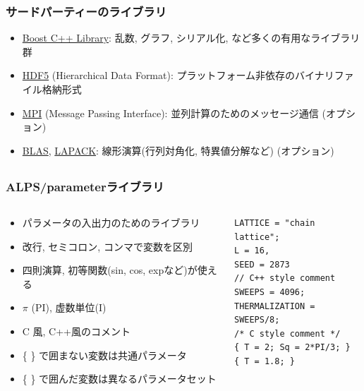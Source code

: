 \begin{frame}[t,fragile]
  \frametitle{サードパーティーのライブラリ}
  \begin{itemize}
    \setlength{\itemsep}{1em}
  \item \href{http://www.boost.org/}{Boost C++ Library}: 乱数, グラフ, シリアル化, など多くの有用なライブラリ群
  \item \href{http://www.hdfgroup.org/HDF5/}{HDF5} (Hierarchical Data Format): プラットフォーム非依存のバイナリファイル格納形式
  \item \href{http://www.mpi-forum.org/}{MPI} (Message Passing Interface): 並列計算のためのメッセージ通信 (オプション)
  \item \href{http://www.netlib.org/blas/}{BLAS}, \href{http://www.netlib.org/lapack/}{LAPACK}: 線形演算(行列対角化, 特異値分解など) (オプション)
  \end{itemize}
\end{frame}

\subsection*{\redb\whitem\greenb}

\begin{frame}[t,fragile]
  \frametitle{ALPS/parameterライブラリ}
  \begin{columns}[T]
    \begin{column}{.5\textwidth}
      \begin{itemize}
      \item パラメータの入出力のためのライブラリ
        \item 改行, セミコロン, コンマで変数を区別
        \item 四則演算, 初等関数(sin, cos, expなど)が使える
        \item $\pi$ (PI), 虚数単位(I)
          \item C 風, C++風のコメント
          \item \{ \} で囲まない変数は共通パラメータ
          \item \{ \} で囲んだ変数は異なるパラメータセット
      \end{itemize}
    \end{column}
    \begin{column}{.5\textwidth}
    \begin{lstlisting}
LATTICE = "chain lattice";
L = 16,
SEED = 2873
// C++ style comment
SWEEPS = 4096;
THERMALIZATION = SWEEPS/8;
/* C style comment */
{ T = 2; Sq = 2*PI/3; }
{ T = 1.8; }
\end{lstlisting}
    \end{column}
  \end{columns}
\end{frame}


